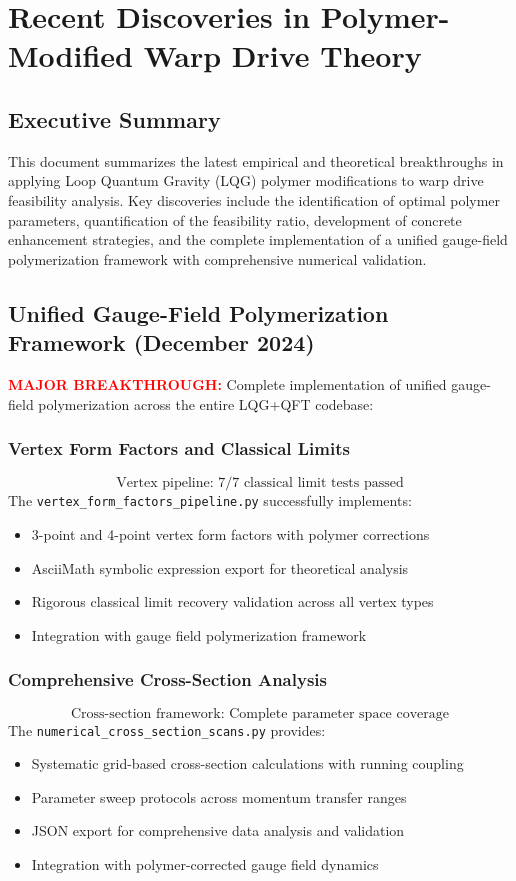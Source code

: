 \documentclass[11pt]{article}
\begin{document}
\section*{Recent Discoveries in Polymer-Modified Warp Drive Theory}

\subsection*{Executive Summary}
This document summarizes the latest empirical and theoretical breakthroughs in applying Loop Quantum Gravity (LQG) polymer modifications to warp drive feasibility analysis. Key discoveries include the identification of optimal polymer parameters, quantification of the feasibility ratio, development of concrete enhancement strategies, and the complete implementation of a unified gauge-field polymerization framework with comprehensive numerical validation.

\subsection*{Unified Gauge-Field Polymerization Framework (December 2024)}

\textcolor{red}{\textbf{MAJOR BREAKTHROUGH:}} Complete implementation of unified gauge-field polymerization across the entire LQG+QFT codebase:

\subsubsection*{Vertex Form Factors and Classical Limits}
\[
  \boxed{\text{Vertex pipeline: } 7/7 \text{ classical limit tests passed}}
\]
The \texttt{vertex\_form\_factors\_pipeline.py} successfully implements:
\begin{itemize}
  \item 3-point and 4-point vertex form factors with polymer corrections
  \item AsciiMath symbolic expression export for theoretical analysis
  \item Rigorous classical limit recovery validation across all vertex types
  \item Integration with gauge field polymerization framework
\end{itemize}

\subsubsection*{Comprehensive Cross-Section Analysis}
\[
  \boxed{\text{Cross-section framework: Complete parameter space coverage}}
\]
The \texttt{numerical\_cross\_section\_scans.py} provides:
\begin{itemize}
  \item Systematic grid-based cross-section calculations with running coupling
  \item Parameter sweep protocols across momentum transfer ranges
  \item JSON export for comprehensive data analysis and validation
  \item Integration with polymer-corrected gauge field dynamics
\end{itemize}
\end{document}
